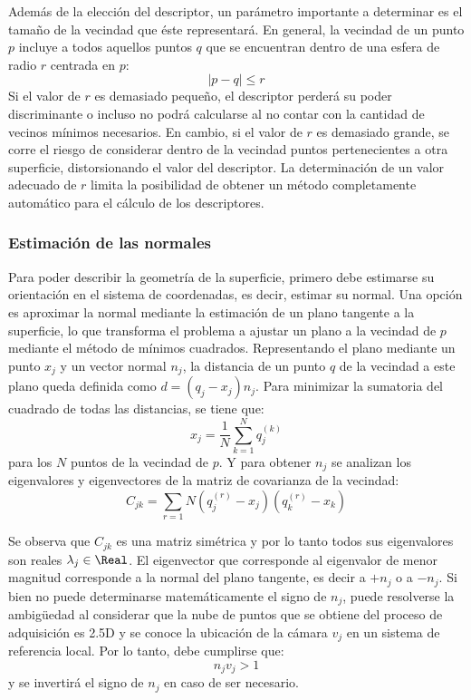 Además de la elección del descriptor, un parámetro importante a determinar es
el tamaño de la vecindad que éste representará.
En general, la vecindad de un punto $p$ incluye a todos aquellos puntos $q$
que se encuentran dentro de una esfera de radio $r$ centrada en $p$:
\[ |p - q| \leq r \]
Si el valor de $r$ es demasiado pequeño, el descriptor perderá su poder discriminante
o incluso no podrá calcularse al no contar con la cantidad de vecinos mínimos necesarios.
En cambio, si el valor de $r$ es demasiado grande, se corre el riesgo de considerar
dentro de la vecindad puntos pertenecientes a otra superficie, distorsionando el valor del descriptor.
La determinación de un valor adecuado de $r$ limita la posibilidad de obtener un método completamente
automático para el cálculo de los descriptores\cite{RusuDoctoralDissertation}.


\subsubsection{Estimación de las normales}
Para poder describir la geometría de la superficie,
primero debe estimarse su orientación en el sistema de coordenadas, es decir, estimar su normal.
Una opción es aproximar la normal mediante la estimación de un plano tangente a la superficie,
lo que transforma el problema a ajustar un plano a la vecindad de $p$
mediante el método de mínimos cuadrados. 
Representando el plano mediante un punto $x_j$ y un vector normal $n_j$,
la distancia de un punto $q$ de la vecindad a este plano queda definida como
$d = (q_j - x_j) n_j$.
Para minimizar la sumatoria del cuadrado de todas las distancias, se tiene que:
\[x_j = \frac{1}{N} \sum_{k=1}^{N} q^{(k)}_j \]
para los $N$ puntos de la vecindad de $p$.
Y para obtener $n_j$ se analizan los eigenvalores y eigenvectores de la matriz de covarianza de la vecindad:
\[ C_{jk} = \sum_{r=1}{N} (q^{(r)}_j - x_j) (q^{(r)}_k - x_k) \]

Se observa que $C_{jk}$ es una matriz simétrica y por lo tanto todos sus eigenvalores son reales
$\lambda_j \in \Real$.
El eigenvector que corresponde al eigenvalor de menor magnitud corresponde a la normal del plano tangente,
es decir a $+n_j$ o a $-n_j$\cite{10.1109/34.334391}.
Si bien no puede determinarse matemáticamente el signo de $n_j$,
puede resolverse la ambigüedad al considerar que la nube de puntos que se obtiene del proceso de adquisición
es 2.5D y se conoce la ubicación de la cámara $v_j$ en un sistema de referencia local.
Por lo tanto, debe cumplirse que:
\[n_j v_j > 1\]
y se invertirá el signo de $n_j$ en caso de ser necesario.

